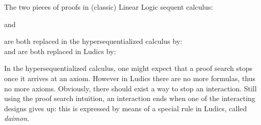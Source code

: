 \documentclass{LMCS}
\begin{document}
\begin{exa}
The two pieces of proofs in (classic) Linear Logic sequent calculus:\\
\begin{center}
  \shortstack{
 \shortstack{ 
 \\
                     }
                     \hspace{1em}
  \shortstack{
                       \\
                     } \\
                     \\
                     \\
                     \\
                     }      
                      and 
      \shortstack{
 \shortstack{
 \\
                     }
                     \hspace{1em}
  \shortstack{
                       \\
                     \\
                     \\
                     } \\
                     \\
                     }
\end{center}

\noindent are both replaced in the hypersequentialized calculus by: 
                              \shortstack{
                     \shortstack{\\
                     }\hspace{2em}
                     \shortstack{\\
                     }\\
                     \\
                     }    \\
and are both replaced in Ludics by: 
                              \shortstack{
                     \shortstack{\\
                     }\hspace{2em}
                     \shortstack{\\
                     }\\
                     \\
                     }    
                     
                              
\label{loci}
\end{exa}
In the hypersequentialized calculus, one might expect that a proof search stops once it  arrives at an axiom. However in Ludics there are no more formulas, thus no more axioms. Obviously, there should exist a way to stop an interaction. Still using the proof search intuition, an interaction ends when one of the interacting designs gives up: this is expressed by means of a special rule in Ludics, called {\it daimon}.
\end{document}
